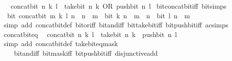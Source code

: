 \begin{isabellebody}
\ \ \ {\isacartoucheopen}concat{\isacharunderscore}{\kern0pt}bit\ n\ k\ l\ {\isacharequal}{\kern0pt}\ take{\isacharunderscore}{\kern0pt}bit\ n\ k\ OR\ push{\isacharunderscore}{\kern0pt}bit\ n\ l{\isacartoucheclose}\isanewline
\isanewline
{}\isamarkupfalse%
\ bit{\isacharunderscore}{\kern0pt}concat{\isacharunderscore}{\kern0pt}bit{\isacharunderscore}{\kern0pt}iff\ {\isacharbrackleft}{\kern0pt}bit{\isacharunderscore}{\kern0pt}simps{\isacharbrackright}{\kern0pt}{\isacharcolon}{\kern0pt}\isanewline
\ \ {\isacartoucheopen}bit\ {\isacharparenleft}{\kern0pt}concat{\isacharunderscore}{\kern0pt}bit\ m\ k\ l{\isacharparenright}{\kern0pt}\ n\ {\isasymlongleftrightarrow}\ n\ {\isacharless}{\kern0pt}\ m\ {\isasymand}\ bit\ k\ n\ {\isasymor}\ m\ {\isasymle}\ n\ {\isasymand}\ bit\ l\ {\isacharparenleft}{\kern0pt}n\ {\isacharminus}{\kern0pt}\ m{\isacharparenright}{\kern0pt}{\isacartoucheclose}\isanewline
%
\isadelimproof
\ \ %
\endisadelimproof
%
\isatagproof
{}\isamarkupfalse%
\ {\isacharparenleft}{\kern0pt}simp\ add{\isacharcolon}{\kern0pt}\ concat{\isacharunderscore}{\kern0pt}bit{\isacharunderscore}{\kern0pt}def\ bit{\isacharunderscore}{\kern0pt}or{\isacharunderscore}{\kern0pt}iff\ bit{\isacharunderscore}{\kern0pt}and{\isacharunderscore}{\kern0pt}iff\ bit{\isacharunderscore}{\kern0pt}take{\isacharunderscore}{\kern0pt}bit{\isacharunderscore}{\kern0pt}iff\ bit{\isacharunderscore}{\kern0pt}push{\isacharunderscore}{\kern0pt}bit{\isacharunderscore}{\kern0pt}iff\ ac{\isacharunderscore}{\kern0pt}simps{\isacharparenright}{\kern0pt}%
\endisatagproof
{\isafoldproof}%
%
\isadelimproof
\isanewline
%
\endisadelimproof
\isanewline
{}\isamarkupfalse%
\ concat{\isacharunderscore}{\kern0pt}bit{\isacharunderscore}{\kern0pt}eq{\isacharcolon}{\kern0pt}\isanewline
\ \ {\isacartoucheopen}concat{\isacharunderscore}{\kern0pt}bit\ n\ k\ l\ {\isacharequal}{\kern0pt}\ take{\isacharunderscore}{\kern0pt}bit\ n\ k\ {\isacharplus}{\kern0pt}\ push{\isacharunderscore}{\kern0pt}bit\ n\ l{\isacartoucheclose}\isanewline
%
\isadelimproof
\ \ %
\endisadelimproof
%
\isatagproof
{}\isamarkupfalse%
\ {\isacharparenleft}{\kern0pt}simp\ add{\isacharcolon}{\kern0pt}\ concat{\isacharunderscore}{\kern0pt}bit{\isacharunderscore}{\kern0pt}def\ take{\isacharunderscore}{\kern0pt}bit{\isacharunderscore}{\kern0pt}eq{\isacharunderscore}{\kern0pt}mask\isanewline
\ \ \ \ bit{\isacharunderscore}{\kern0pt}and{\isacharunderscore}{\kern0pt}iff\ bit{\isacharunderscore}{\kern0pt}mask{\isacharunderscore}{\kern0pt}iff\ bit{\isacharunderscore}{\kern0pt}push{\isacharunderscore}{\kern0pt}bit{\isacharunderscore}{\kern0pt}iff\ disjunctive{\isacharunderscore}{\kern0pt}add{\isacharparenright}{\kern0pt}%

\end{isabellebody}

